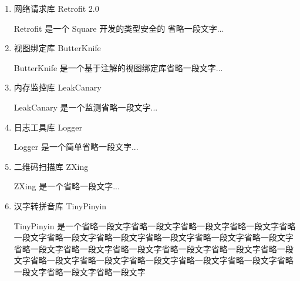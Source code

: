 	\begin{enumerate}[fullwidth,itemindent=2em,listparindent=2em]
	
		\item 网络请求库 Retrofit 2.0
		
		Retrofit 是一个 Square 开发的类型安全的 省略一段文字...
				
		\item 视图绑定库 ButterKnife
		
		ButterKnife 是一个基于注解的视图绑定库省略一段文字...
		
		\item 内存监控库 LeakCanary
		
		LeakCanary 是一个监测省略一段文字...	
		
		\item 日志工具库 Logger
		
		Logger 是一个简单省略一段文字...
		
		\item 二维码扫描库 ZXing
		
		ZXing 是一个省略一段文字...		
		
		\item 汉字转拼音库 TinyPinyin

		TinyPinyin 是一个省略一段文字省略一段文字省略一段文字省略一段文字省略一段文字省略一段文字省略一段文字省略一段文字省略一段文字省略一段文字省略一段文字省略一段文字省略一段文字省略一段文字省略一段文字省略一段文字省略一段文字省略一段文字省略一段文字省略一段文字省略一段文字省略一段文字省略一段文字省略一段文字		
			
	\end{enumerate}
	
	
\clearpage